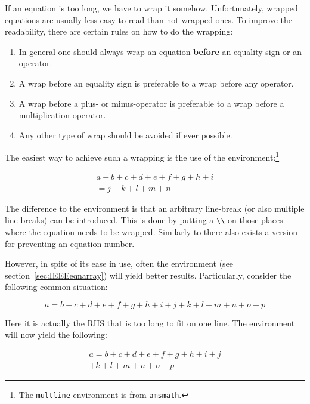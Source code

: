 If an equation is too long, we have to wrap it somehow. Unfortunately,
wrapped equations are usually less easy to read than not wrapped
ones. To improve the readability, there are certain rules on how to do
the wrapping:
\begin{enumerate}
\item In general one should always wrap an equation \textbf{before} an
  equality sign or an operator.
\item A wrap before an equality sign is preferable to a wrap before
  any operator.
\item A wrap before a plus- or minus-operator is preferable to a wrap
  before a multiplication-operator.
\item Any other type of wrap should be avoided if ever possible.
\end{enumerate}
The easiest way to achieve such a wrapping is the use of the
 en\-vi\-ron\-ment:\footnote{The
  \texttt{multline}-environment is from \texttt{amsmath}.}
\begin{example}
\begin{multline}
  a + b + c + d + e + f 
  + g + h + i  
  \\
  = j + k + l + m + n 
\end{multline}
\end{example}
\noindent
The difference to the  environment is that an arbitrary
line-break (or also multiple line-breaks) can be introduced. This is
done by putting a \verb+\\+ on those places where the equation needs
to be wrapped. Similarly to  there also exists a
 version for preventing an equation number.

However, in spite of its ease in use, often the
 environment (see section~\ref{sec:IEEEeqnarray})
will yield better results.  Particularly, consider the following
common situation:
\begin{example}
\begin{equation}
  a = b + c + d + e + f 
  + g + h + i + j 
  + k + l + m + n + o + p  
  \label{eq:equation_too_long}
\end{equation}
\end{example}
\noindent
Here it is actually the RHS that is too long to fit on one line. The
 environment will now yield the following:
\begin{example}
\begin{multline}
  a = b + c + d + e + f 
  + g + h + i + j \\
  + k + l + m + n + o + p
\end{multline}
\end{example}

